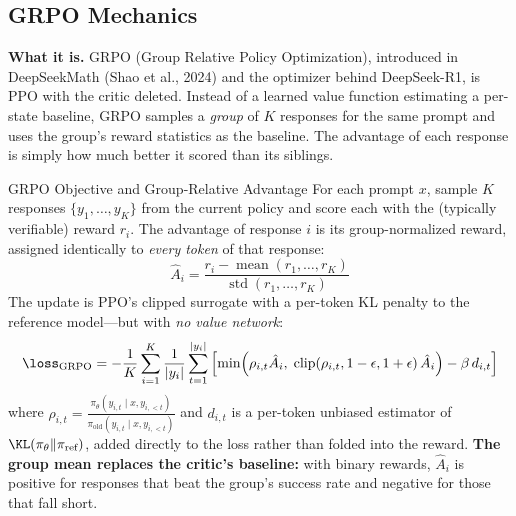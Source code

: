 \subsection{GRPO Mechanics}

\textbf{What it is.} GRPO (Group Relative Policy Optimization), introduced in DeepSeekMath (Shao et al., 2024) and the optimizer behind DeepSeek-R1, is PPO with the critic deleted. Instead of a learned value function estimating a per-state baseline, GRPO samples a \textit{group} of $K$ responses for the same prompt and uses the group's reward statistics as the baseline. The advantage of each response is simply how much better it scored than its siblings.

\begin{mathresult}{GRPO Objective and Group-Relative Advantage}
For each prompt $x$, sample $K$ responses $\{y_1, \ldots, y_K\}$ from the current policy and score each with the (typically verifiable) reward $r_i$. The advantage of response $i$ is its group-normalized reward, assigned identically to \textit{every token} of that response:
\begin{equation}
\hat{A}_i = \frac{r_i - \operatorname{mean}(r_1, \ldots, r_K)}{\operatorname{std}(r_1, \ldots, r_K)}
\end{equation}
The update is PPO's clipped surrogate with a per-token KL penalty to the reference model---but with \textit{no value network}:
\begin{equation}
\loss_{\text{GRPO}} = -\frac{1}{K}\sum_{i=1}^{K} \frac{1}{|y_i|}\sum_{t=1}^{|y_i|} \left[\min\!\left(\rho_{i,t}\hat{A}_i,\; \text{clip}\!\left(\rho_{i,t}, 1-\epsilon, 1+\epsilon\right)\hat{A}_i\right) - \beta\, d_{i,t}\right]
\end{equation}
where $\rho_{i,t} = \frac{\pi_\theta(y_{i,t} \mid x, y_{i,<t})}{\pi_{\text{old}}(y_{i,t} \mid x, y_{i,<t})}$ and $d_{i,t}$ is a per-token unbiased estimator of $\KL(\pi_\theta \| \pi_{\text{ref}})$, added directly to the loss rather than folded into the reward. \textbf{The group mean replaces the critic's baseline:} with binary rewards, $\hat{A}_i$ is positive for responses that beat the group's success rate and negative for those that fall short.
\end{mathresult}

